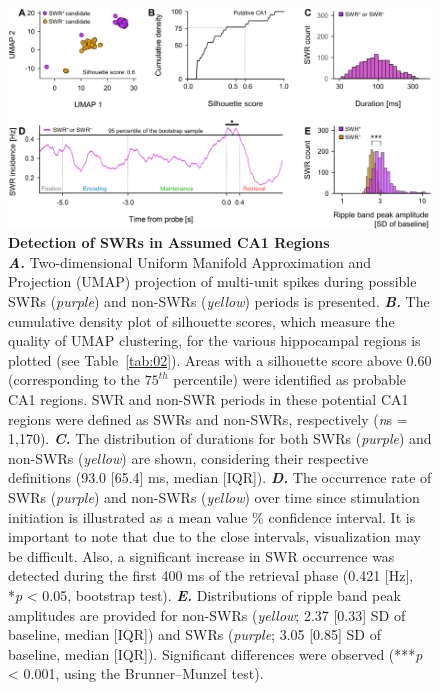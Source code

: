\documentclass[final,3p,times,twocolumn]{elsarticle}
\begin{document}
        \clearpage
        \begin{figure}[ht]
        	\centering
            \includegraphics[width=1\textwidth]{./src/figures/.png/Figure_ID_04.png}
        	\caption{\textbf{
Detection of SWRs in Assumed CA1 Regions}
\smallskip
\\
\textbf{\textit{A.}} Two-dimensional Uniform Manifold Approximation and Projection (UMAP) projection of multi-unit spikes during possible SWRs (\textit{purple}) and non-SWRs (\textit{yellow}) periods is presented\cite{mcinnes_umap_2018}. \textbf{\textit{B.}} The cumulative density plot of silhouette scores, which measure the quality of UMAP clustering, for the various hippocampal regions is plotted (see Table~\ref{tab:02}). Areas with a silhouette score above 0.60 (corresponding to the $75^{th}$ percentile) were identified as probable CA1 regions. SWR and non-SWR periods in these potential CA1 regions were defined as SWRs and non-SWRs, respectively (\textit{n}s = 1,170)\cite{rousseeuw_silhouettes_1987}. \textbf{\textit{C.}} The distribution of durations for both SWRs (\textit{purple}) and non-SWRs (\textit{yellow}) are shown, considering their respective definitions (93.0 [65.4] ms, median [IQR])\cite{girardeau_selective_2009}\cite{norman_hippocampal_2021}. \textbf{\textit{D.}} The occurrence rate of SWRs (\textit{purple}) and non-SWRs (\textit{yellow}) over time since stimulation initiation is illustrated as a mean value \% confidence interval. It is important to note that due to the close intervals, visualization may be difficult. Also, a significant increase in SWR occurrence was detected during the first 400 ms of the retrieval phase (0.421 [Hz], *\textit{p} < 0.05, bootstrap test)\cite{buzsaki_hippocampal_2015}\cite{ego-stengel_disruption_2010}\cite{fernandez-ruiz_long-duration_2019}. \textbf{\textit{E.}} Distributions of ripple band peak amplitudes are provided for non-SWRs (\textit{yellow}; 2.37 [0.33] SD of baseline, median [IQR]) and SWRs (\textit{purple}; 3.05 [0.85] SD of baseline, median [IQR]). Significant differences were observed (***\textit{p} < 0.001, using the Brunner--Munzel test)\cite{norman_hippocampal_2019}\cite{diba_forward_2007}\cite{liu_consensus_2022}.
}
        	\label{fig:04}
        \end{figure}
\end{document}
